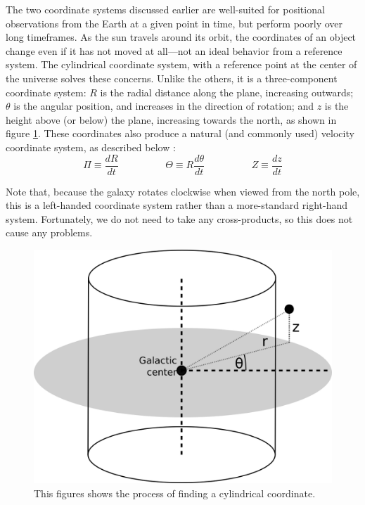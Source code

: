 \documentclass[12pt,twoside]{reedthesis}
\begin{document}
The two coordinate systems discussed earlier are well-suited for positional observations from the Earth at a given point in time, but perform poorly over long timeframes. As the sun travels around its orbit, the coordinates of an object change even if it has not moved at all---not an ideal behavior from a reference system. The cylindrical coordinate system, with a reference point at the center of the universe solves these concerns. Unlike the others, it is a three-component coordinate system: $R$ is the radial distance along the plane, increasing outwards; $\theta$ is the angular position, and increases in the direction of rotation; and $z$ is the height above (or below) the plane, increasing towards the north, as shown in figure \ref{cylindrical-coords}. These coordinates also produce a natural (and commonly used) velocity coordinate system, as described below \citep{modern-astrophysics}:
\begin{equation}
    \Pi \equiv \frac{dR}{dt} \hspace{2cm} \Theta \equiv R\frac{d\theta}{dt} \hspace{2cm} Z \equiv \frac{dz}{dt}
\end{equation}

Note that, because the galaxy rotates clockwise when viewed from the north pole, this is a left-handed coordinate system rather than a more-standard right-hand system. Fortunately, we do not need to take any cross-products, so this does not cause any problems.

\begin{figure}[p]
    \includegraphics{imgs/cyl-coords}
    \caption{This figures shows the process of finding a cylindrical coordinate.}
    \label{cylindrical-coords}
\end{figure}
\end{document}
